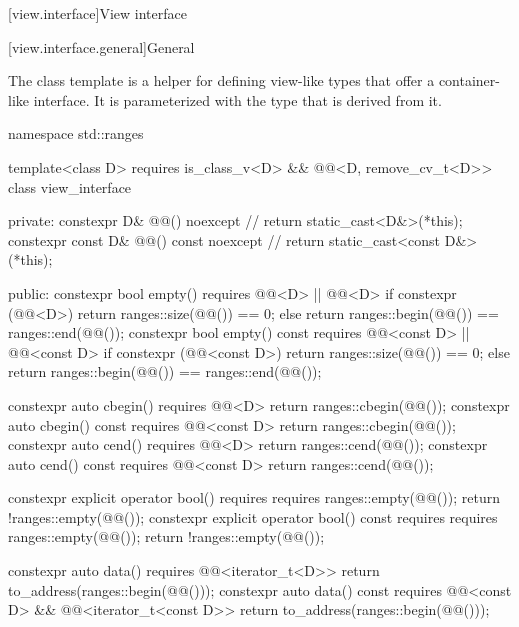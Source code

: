 [view.interface]{View interface}

[view.interface.general]{General}

\pnum
The class template  is a helper for defining
view-like types that offer a container-like interface. It is
parameterized with the type that is derived from it.

%
\begin{codeblock}
namespace std::ranges {
  template<class D>
    requires is_class_v<D> && @@<D, remove_cv_t<D>>
  class view_interface {
  private:
    constexpr D& @@() noexcept {               // \expos
      return static_cast<D&>(*this);
    }
    constexpr const D& @@() const noexcept {   // \expos
      return static_cast<const D&>(*this);
    }

  public:
    constexpr bool empty() requires @@<D> || @@<D> {
      if constexpr (@@<D>)
        return ranges::size(@@()) == 0;
      else
        return ranges::begin(@@()) == ranges::end(@@());
    }
    constexpr bool empty() const requires @@<const D> || @@<const D> {
      if constexpr (@@<const D>)
        return ranges::size(@@()) == 0;
      else
        return ranges::begin(@@()) == ranges::end(@@());
    }

    constexpr auto cbegin() requires @@<D> {
      return ranges::cbegin(@@());
    }
    constexpr auto cbegin() const requires @@<const D> {
      return ranges::cbegin(@@());
    }
    constexpr auto cend() requires @@<D> {
      return ranges::cend(@@());
    }
    constexpr auto cend() const requires @@<const D> {
      return ranges::cend(@@());
    }

    constexpr explicit operator bool()
      requires requires { ranges::empty(@@()); } {
        return !ranges::empty(@@());
      }
    constexpr explicit operator bool() const
      requires requires { ranges::empty(@@()); } {
        return !ranges::empty(@@());
      }

    constexpr auto data() requires @@<iterator_t<D>> {
      return to_address(ranges::begin(@@()));
    }
    constexpr auto data() const
      requires @@<const D> && @@<iterator_t<const D>> {
        return to_address(ranges::begin(@@()));
      }

}}
\end{codeblock}
